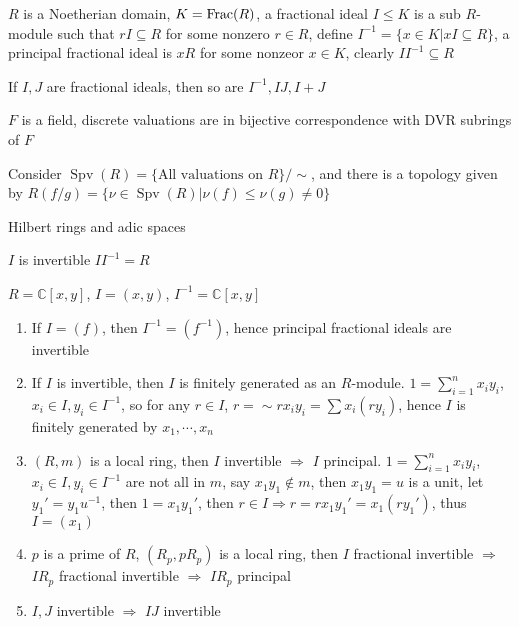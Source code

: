 \documentclass[../main.tex]{subfiles}
\begin{document}
\begin{definition}
$R$ is a Noetherian domain, $K=\operatorname{Frac}(R)$, a fractional ideal $I\leq K$ is a sub $R$-module such that $rI\subseteq R$ for some nonzero $r\in R$, define $I^{-1}=\{x\in K|xI\subseteq R\}$, a principal fractional ideal is $xR$ for some nonzeor $x\in K$, clearly $II^{-1}\subseteq R$
\end{definition}

\begin{lemma}
If $I,J$ are fractional ideals, then so are $I^{-1},IJ,I+J$
\end{lemma}

\begin{proposition}
$F$ is a field, discrete valuations are in bijective correspondence with DVR subrings of $F$
\end{proposition}

\begin{definition}
Consider $\operatorname{Spv}(R)=\{\text{All valuations on }R\}/\sim$, and there is a topology given by $R(f/g)=\{\nu\in\operatorname{Spv}(R)|\nu(f)\leq\nu(g)\neq0\}$
\end{definition}

Hilbert rings and adic spaces

\begin{definition}
$I$ is invertible $II^{-1}=R$
\end{definition}

\begin{example}
$R=\mathbb C[x,y]$, $I=(x,y)$, $I^{-1}=\mathbb C[x,y]$
\end{example}

\begin{proposition}
\begin{enumerate}
\item If $I=(f)$, then $I^{-1}=(f^{-1})$, hence principal fractional ideals are invertible
\item If $I$ is invertible, then $I$ is finitely generated as an $R$-module. $1=\sum_{i=1}^nx_iy_i$, $x_i\in I,y_i\in I^{-1}$, so for any $r\in I$, $r=\sim rx_iy_i=\sum x_i(ry_i)$, hence $I$ is finitely generated by $x_1,\cdots,x_n$
\item $(R,m)$ is a local ring, then $I$ invertible $\Rightarrow$ $I$ principal. $1=\sum_{i=1}^nx_iy_i$, $x_i\in I,y_i\in I^{-1}$ are not all in $m$, say $x_1y_1\notin m$, then $x_1y_1=u$ is a unit, let $y_1'=y_1u^{-1}$, then $1=x_1y_1'$, then $r\in I\Rightarrow r=rx_1y_1'=x_1(ry_1')$, thus $I=(x_1)$
\item $p$ is a prime of $R$, $(R_p,pR_p)$ is a local ring, then $I$ fractional invertible $\Rightarrow$ $IR_p$ fractional invertible $\Rightarrow$ $IR_p$ principal
\item $I,J$ invertible $\Rightarrow$ $IJ$ invertible
\end{enumerate}
\end{proposition}
\end{document}
